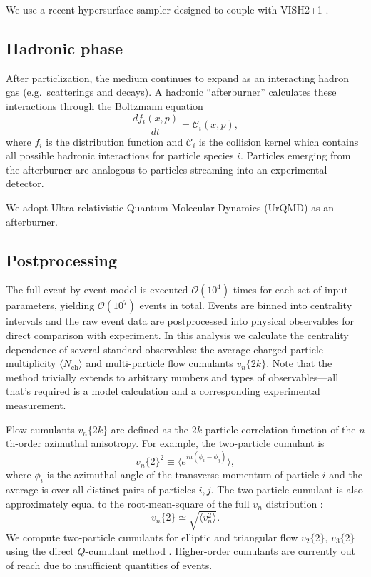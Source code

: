 \documentclass[aps,prc,reprint,superscriptaddress,amsmath]{revtex4-1}
\newcommand{\avg}[1]{\langle #1 \rangle}
\newcommand{\nch}{N_\text{ch}}
\newcommand{\vnk}[2]{v_#1\{#2\}}
\newcommand{\order}[1]{$\mathcal O(10^{#1})$}
\begin{document}
We use a recent hypersurface sampler designed to couple with VISH2+1 \cite{Qiu:2013wca,Shen:2014vra}.

\subsection{Hadronic phase}

After particlization, the medium continues to expand as an interacting hadron gas (e.g.\ scatterings and decays).
A hadronic ``afterburner'' calculates these interactions through the Boltzmann equation
\begin{equation}
  \frac{df_i(x,p)}{dt} = \mathcal C_i(x,p),
\end{equation}
where $f_i$ is the distribution function and $\mathcal C_i$ is the collision kernel which contains all possible hadronic interactions for particle species $i$.
Particles emerging from the afterburner are analogous to particles streaming into an experimental detector.

We adopt Ultra-relativistic Quantum Molecular Dynamics (UrQMD) \cite{Bass:1998ca,Bleicher:1999xi} as an afterburner.

\subsection{Postprocessing}

The full event-by-event model is executed \order 4 times for each set of input parameters, yielding \order 7 events in total.
Events are binned into centrality intervals and the raw event data are postprocessed into physical observables for direct comparison with experiment.
In this analysis we calculate the centrality dependence of several standard observables:
the average charged-particle multiplicity $\avg\nch$ and multi-particle flow cumulants $\vnk n {2k}$.
Note that the method trivially extends to arbitrary numbers and types of observables---all that's required is a model calculation and a corresponding experimental measurement.

Flow cumulants $\vnk n {2k}$ are defined as the $2k$-particle correlation function of the $n$th-order azimuthal anisotropy.
For example, the two-particle cumulant is
\begin{equation}
  \vnk n 2^2 \equiv \bigl\langle e^{in(\phi_i - \phi_j)} \bigr\rangle,
\end{equation}
where $\phi_i$ is the azimuthal angle of the transverse momentum of particle $i$ and the average is over all distinct pairs of particles $i,j$.
The two-particle cumulant is also approximately equal to the root-mean-square of the full $v_n$ distribution \cite{Borghini:2000sa}:
\begin{equation}
  \vnk n 2 \simeq \sqrt{\avg{v_n^2}}.
\end{equation}
We compute two-particle cumulants for elliptic and triangular flow $\vnk 2 2$, $\vnk 3 2$ using the direct $Q$-cumulant method \cite{Bilandzic:2010jr}.
Higher-order cumulants are currently out of reach due to insufficient quantities of events.
\end{document}
